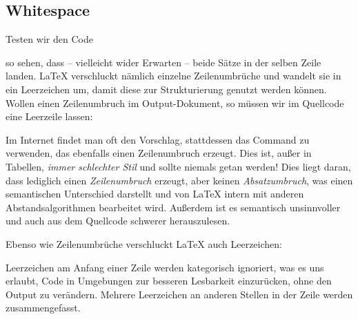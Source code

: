 \subsection{Whitespace}
Testen wir den Code
so sehen, dass -- vielleicht wider Erwarten -- beide Sätze in der selben Zeile landen.
\LaTeX{} verschluckt nämlich einzelne Zeilenumbrüche und wandelt sie in ein Leerzeichen um, damit diese zur Strukturierung genutzt werden können.
Wollen einen Zeilenumbruch im Output-Dokument, so müssen wir im Quellcode eine Leerzeile lassen:
Im Internet findet man oft den Vorschlag, stattdessen das Command \latexcommand{\textbackslash} zu verwenden, das ebenfalls einen Zeilenumbruch erzeugt.
Dies ist, außer in Tabellen, \emph{immer schlechter Stil} und sollte niemals getan werden!
Dies liegt daran, dass \latexcommand{\textbackslash} lediglich einen \emph{Zeilenumbruch} erzeugt, aber keinen \emph{Absatzumbruch}, was einen semantischen Unterschied darstellt und von \LaTeX{} intern mit anderen Abstandsalgorithmen bearbeitet wird.
Außerdem ist es semantisch unsinnvoller und auch aus dem Quellcode schwerer herauszulesen.

Ebenso wie Zeilenumbrüche verschluckt \LaTeX{} auch Leerzeichen:
Leerzeichen am Anfang einer Zeile werden kategorisch ignoriert, was es uns erlaubt, Code in Umgebungen zur besseren Lesbarkeit einzurücken, ohne den Output zu verändern.
Mehrere Leerzeichen an anderen Stellen in der Zeile werden zusammengefasst.


